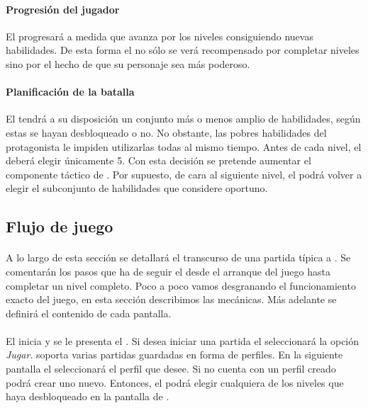 \paragraph{Progresión del jugador}
El \jugador progresará a medida que avanza por los niveles consiguiendo
nuevas habilidades. De esta forma el \jugador no sólo se verá recompensado
por completar niveles sino por el hecho de que su personaje sea más poderoso.

\paragraph{Planificación de la batalla}
El \jugador tendrá a su disposición un conjunto más o menos amplio de habilidades,
según estas se hayan desbloqueado o no. No obstante, las pobres habilidades
del protagonista le impiden utilizarlas todas al mismo tiempo. Antes de cada
nivel, el \jugador deberá elegir únicamente 5. Con esta decisión se pretende
aumentar el componente táctico de \juego. Por supuesto, de cara al siguiente
nivel, el \jugador podrá volver a elegir el subconjunto de habilidades
que considere oportuno.

\subsection{Flujo de juego}
\label{sec:mec-flujo}

\paragraph{}
A lo largo de esta sección se detallará el transcurso de una partida típica
a \juego. Se comentarán los pasos que ha de seguir el \jugador desde el arranque
del juego hasta completar un nivel completo. Poco a poco vamos desgranando
el funcionamiento exacto del juego, en esta sección describimos las mecánicas.
Más adelante se definirá el contenido de cada pantalla.

\paragraph{}
El \jugador inicia \juego y se le presenta el \menu. Si desea iniciar una
partida el \jugador seleccionará la opción \emph{Jugar}. \juego soporta
varias partidas guardadas en forma de perfiles. En la
siguiente pantalla el \jugador seleccionará el perfil que desee. Si no
cuenta con un perfil creado podrá crear uno nuevo. Entonces,
el \jugador podrá elegir cualquiera de los niveles que haya desbloqueado
en la pantalla de \selnivel.

